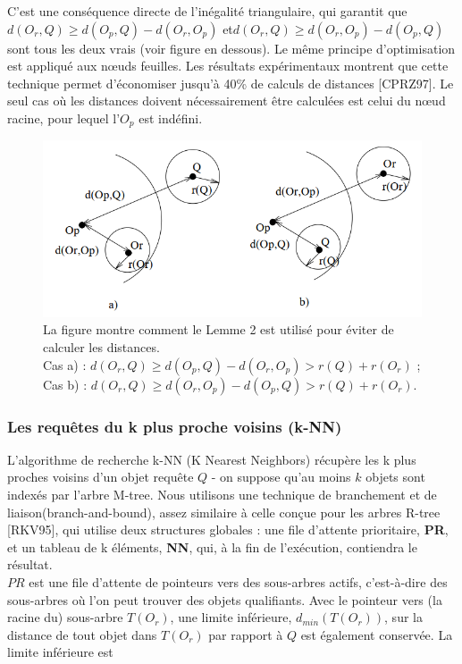 C'est une conséquence directe de l'inégalité triangulaire, qui garantit que $ d(O_r, Q) \ge d(O_p, Q)-d(O_r, O_p) $ et$  d(O_r, Q) \ge d(O_r, O_p)-d(O_p, Q) $ sont tous les deux vrais (voir figure en dessous). Le même principe d'optimisation est appliqué aux nœuds feuilles. Les résultats expérimentaux montrent que cette technique permet d'économiser jusqu'à 40\% de calculs de distances [CPRZ97]. Le seul cas où les distances doivent nécessairement être calculées est celui du nœud racine, pour lequel l'$ O_p $ est indéfini.

\begin{figure}[H]
	\centering
	\includegraphics[width=.6 \textwidth]{Figures/lemme.png} %
	\caption{La figure montre comment le Lemme 2 est utilisé pour éviter de calculer les distances. \\Cas a) : $ d(O_r, Q) \ge d(O_p, Q) - d(O_r, O_p) > r(Q) + r(O_r) $ ; \\
		Cas b) : $ d(O_r, Q) \ge d(O_r, O_p) - d(O_p, Q) > r(Q) + r(O_r) $.}
\end{figure} 

\subsubsection{Les requêtes du k plus proche voisins (k-NN)}

L'algorithme de recherche k-NN (K Nearest Neighbors) récupère les k plus proches voisins d'un objet requête $ Q $ - on suppose qu'au moins $ k $ objets sont indexés par l'arbre M-tree. Nous utilisons une technique de branchement et de liaison(branch-and-bound), assez similaire à celle conçue pour les arbres R-tree [RKV95], qui utilise deux structures globales : une file d'attente prioritaire, \textbf{PR}, et un tableau de k éléments, \textbf{NN}, qui, à la fin de l'exécution, contiendra le résultat.\\

$ PR $ est une file d'attente de pointeurs vers des sous-arbres actifs, c'est-à-dire des sous-arbres où l'on peut trouver des objets qualifiants. Avec le pointeur vers (la racine du) sous-arbre $ T (O_r) $, une limite inférieure, $ d_{min}(T (O_r)) $, sur la distance de tout objet dans $ T (O_r) $ par rapport à $ Q $ est également conservée. La limite inférieure est

